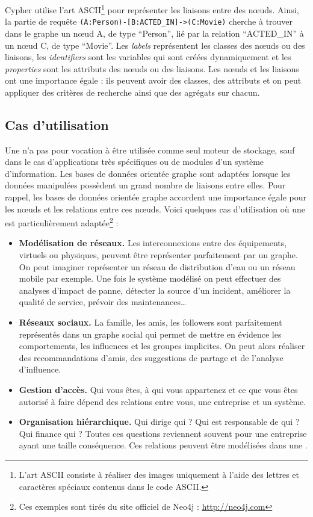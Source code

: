 		Cypher utilise l'art ASCII\footnote{L'art ASCII consiste à réaliser des images uniquement à l'aide des lettres et caractères spéciaux contenus dans le code ASCII.\cite{Wikipedia_artASCII}} pour représenter les liaisons entre des nœuds. Ainsi, la partie de requête \texttt{(A:Person)-[B:ACTED\_IN]->(C:Movie)} cherche à trouver dans le graphe un nœud A, de type \enquote{Person}, lié par la relation \enquote{ACTED\_IN} à un nœud C, de type \enquote{Movie}. Les \textit{labels} représentent les classes des nœuds ou des liaisons, les \textit{identifiers} sont les variables qui sont créées dynamiquement et les \textit{properties} sont les attributs des nœuds ou des liaisons. Les nœuds et les liaisons ont une importance égale : ils peuvent avoir des classes, des attributs et on peut appliquer des critères de recherche ainsi que des agrégats sur chacun.

\subsection{Cas d'utilisation}
	Une \bddGraphe{} n'a pas pour vocation à être utilisée comme seul moteur de stockage, sauf dans le cas d'applications très spécifiques ou de modules d'un système d'information. Les bases de données orientée graphe sont adaptées lorsque les données manipulées possèdent un grand nombre de liaisons entre elles. Pour rappel, les bases de données orientée graphe accordent une importance égale pour les nœuds et les relations entre ces nœuds. Voici quelques cas d'utilisation où une \bddGraphe{} est particulièrement adaptée\footnote{Ces exemples sont tirés du site officiel de Neo4j : \url{http://neo4j.com}} :
	\vspace{10px}
	\begin{itemize}
	 	\item \textbf{Modélisation de réseaux.} Les interconnexions entre des équipements, virtuels ou physiques, peuvent être représenter parfaitement par un graphe. On peut imaginer représenter un réseau de distribution d'eau ou un réseau mobile par exemple. Une fois le système modélisé on peut effectuer des analyses d'impact de panne, détecter la source d'un incident, améliorer la qualité de service, prévoir des maintenances\dots
	 	\item \textbf{Réseaux sociaux.} La famille, les amis, les followers sont parfaitement représentés dans un graphe social qui permet de mettre en évidence les comportements, les influences et les groupes implicites. On peut alors réaliser des recommandations d'amis, des suggestions de partage et de l'analyse d'influence.
	 	\item \textbf{Gestion d'accès.} Qui vous êtes, à qui vous appartenez et ce que vous êtes autorisé à faire dépend des relations entre vous, une entreprise et un système.
	 	\item \textbf{Organisation hiérarchique.} Qui dirige qui ? Qui est responsable de qui ? Qui finance qui ? Toutes ces questions reviennent souvent pour une entreprise ayant une taille conséquence. Ces relations peuvent être modélisées dans une \bddGraphe{}.
	 \end{itemize} 

